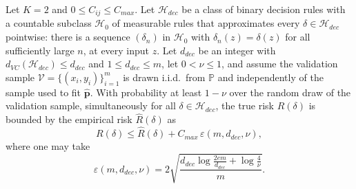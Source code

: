 \begin{proposition}\label{prop:gen_bound}
Let $K = 2$ and $0 \leq C_{ij} \leq C_{max}$. Let $\mathcal{H}_{dec}$ be a class of binary decision rules with a countable subclass $\mathcal{H}_0$ of measurable rules that approximates every $\delta \in \mathcal{H}_{dec}$ pointwise: there is a sequence $(\delta_n)$ in $\mathcal{H}_0$ with $\delta_n(z) = \delta(z)$ for all sufficiently large $n$, at every input $z$. Let $d_{dec}$ be an integer with $d_{VC}(\mathcal{H}_{dec}) \leq d_{dec}$ and $1 \leq d_{dec} \leq m$, let $0 < \nu \leq 1$, and assume the validation sample $\mathcal{V}=\{(x_i,y_i)\}_{i=1}^m$ is drawn i.i.d.\ from $\mathbb{P}$ and independently of the sample used to fit $\hat{\mathbf{p}}$. With probability at least $1-\nu$ over the random draw of the validation sample, simultaneously for all $\delta \in \mathcal{H}_{dec}$, the true risk $R(\delta)$ is bounded by the empirical risk $\hat{R}(\delta)$ as
\begin{equation}\label{eq:generic_decision_gen_bound}
    R(\delta) \leq \hat{R}(\delta) + C_{max}\,\varepsilon(m,d_{dec},\nu),
\end{equation}
where one may take
\begin{equation}\label{eq:vc_decision_rate}
    \varepsilon(m,d_{dec},\nu)=2\sqrt{\frac{d_{dec}\log\frac{2em}{d_{dec}}+\log\frac{4}{\nu}}{m}}.
\end{equation}
\end{proposition}

